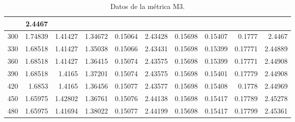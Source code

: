 \begin{table}[h]
\begin{tabular}{|r|r|r|r|r|r|r|r|r|r|}
        &{\tiny 2.4467} \\
        \hline \tiny 300 &{\tiny 1.74839}    &{\tiny 1.41427}    &{\tiny 1.34672}    &{\tiny
        0.15064}    &{\tiny 2.43428}    &{\tiny 0.15698}    &{\tiny 0.15407}    &{\tiny 0.1777}
        &{\tiny 2.4467} \\
        \hline \tiny 330 &{\tiny 1.68518}    &{\tiny 1.41427}    &{\tiny 1.35038}    &{\tiny
        0.15066}    &{\tiny 2.43431}    &{\tiny 0.15698}    &{\tiny 0.15399}    &{\tiny 0.17771}
        &{\tiny 2.44889} \\
        \hline \tiny 360 &{\tiny 1.68518}    &{\tiny 1.41427}    &{\tiny 1.36415}    &{\tiny
        0.15074}    &{\tiny 2.43575}    &{\tiny 0.15698}    &{\tiny 0.15399}    &{\tiny 0.17771}
        &{\tiny 2.44908} \\
        \hline \tiny 390 &{\tiny 1.68518}    &{\tiny 1.4165}    &{\tiny 1.37201}    &{\tiny
        0.15074}    &{\tiny 2.43575}    &{\tiny 0.15698}    &{\tiny 0.15401}    &{\tiny 0.17779}
        &{\tiny 2.44908} \\
        \hline \tiny 420 &{\tiny 1.6853}    &{\tiny 1.4165}    &{\tiny 1.36456}    &{\tiny 0.15077}
        &{\tiny 2.43577}    &{\tiny 0.15698}    &{\tiny 0.15408}    &{\tiny 0.1778}    &{\tiny 2.44969} \\
        \hline \tiny 450 &{\tiny 1.65975}    &{\tiny 1.42802}    &{\tiny 1.36761}    &{\tiny
        0.15076}    &{\tiny 2.44138}    &{\tiny 0.15698}    &{\tiny 0.15417}    &{\tiny 0.17789}
        &{\tiny 2.45278} \\
        \hline \tiny 480 &{\tiny 1.65975}    &{\tiny 1.41694}    &{\tiny 1.38022}    &{\tiny
        0.15077}    &{\tiny 2.44199}    &{\tiny 0.15698}    &{\tiny 0.15417}    &{\tiny 0.17799}
        &{\tiny 2.45361} \\
        \hline
    \end{tabular}
    \caption{Datos de la m\'etrica M3.}
    \label{tabA3}
\end{table}

